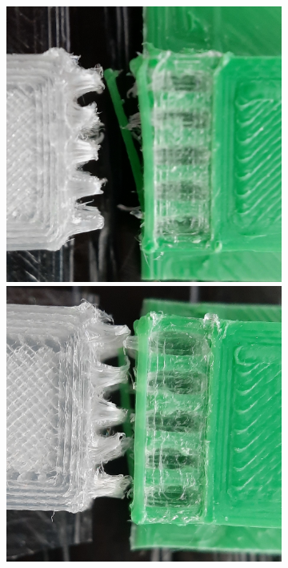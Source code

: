\begin{figure}
\begin{subfigure}[B]{.99\columnwidth}
		\includegraphics[width=\figwidth]{sources/testing/j3_cropped.jpg}
		\includegraphics[width=\figwidth]{sources/testing/j4_cropped.jpg}

\end{subfigure}
\end{figure}
